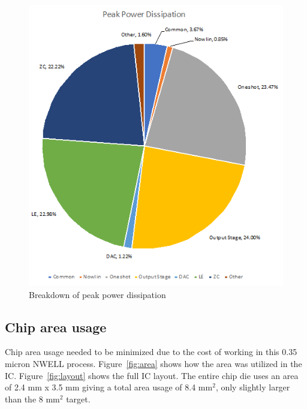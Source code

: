 \documentclass[12pt,oneside,final]{siuethesis}
\theoremstyle{definition}
\begin{document}
\begin{figure}[htbp!]
 \centering
 \includegraphics[scale=1]{./ch4_figures/peak_power.png}
 \caption{Breakdown of peak power dissipation}
 \label{fig:peak_pwr}
\end{figure} 

\subsection{Chip area usage}
\par Chip area usage needed to be minimized due to the cost of working in this 0.35 micron NWELL process. Figure~\ref{fig:area} shows how the area was utilized in the IC. Figure~\ref{fig:layout} shows the full IC layout. The entire chip die uses an area of 2.4 mm x 3.5 mm giving a total area usage of 8.4 mm$^{2}$, only slightly larger than the 8 mm$^{2}$ target.
\end{document}
